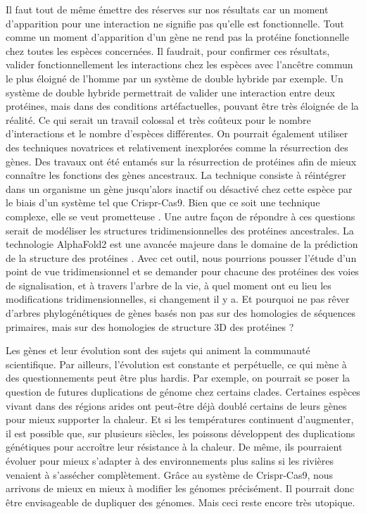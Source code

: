 \par Il faut tout de même émettre des réserves sur nos résultats car un moment d’apparition pour une interaction ne signifie pas qu’elle est fonctionnelle. Tout comme un moment d’apparition d’un gène ne rend pas la protéine fonctionnelle chez toutes les espèces concernées. Il faudrait, pour confirmer ces résultats, valider fonctionnellement les interactions chez les espèces avec l’ancêtre commun le plus éloigné de l’homme par un système de double hybride par exemple. Un système de double hybride permettrait de valider une interaction entre deux protéines, mais dans des conditions artéfactuelles, pouvant être très éloignée de la réalité. Ce qui serait un travail colossal et très coûteux pour le nombre d’interactions et le nombre d’espèces différentes. On pourrait également utiliser des techniques novatrices et relativement inexplorées comme la résurrection des gènes. Des travaux ont été entamés sur la résurrection de protéines afin de mieux connaître les fonctions des gènes ancestraux. La technique consiste à réintégrer dans un organisme un gène jusqu’alors inactif ou désactivé chez cette espèce par le biais d’un système tel que Crispr-Cas9. Bien que ce soit une technique complexe, elle se veut prometteuse \parencite{harms_evolutionary_2013}. Une autre façon de répondre à ces questions serait de modéliser les structures tridimensionnelles des protéines ancestrales. La technologie AlphaFold2 est une avancée majeure dans le domaine de la prédiction de la structure des protéines \parencite{cramer_alphafold2_2021}. Avec cet outil, nous pourrions pousser l’étude d’un point de vue tridimensionnel et se demander pour chacune des protéines des voies de signalisation, et à travers l’arbre de la vie, à quel moment ont eu lieu les modifications tridimensionnelles, si changement il y a. Et pourquoi ne pas rêver d'arbres phylogénétiques de gènes basés non pas sur des homologies de séquences primaires, mais sur des homologies de structure 3D des protéines ?
\par Les gènes et leur évolution sont des sujets qui animent la communauté scientifique. Par ailleurs, l’évolution est constante et perpétuelle, ce qui mène à des questionnements peut être plus hardis. Par exemple, on pourrait se poser la question de futures duplications de génome chez certains clades. Certaines espèces vivant dans des régions arides ont peut-être déjà doublé certains de leurs gènes pour mieux supporter la chaleur. Et si les températures continuent d'augmenter, il est possible que, sur plusieurs siècles, les poissons développent des duplications génétiques pour accroître leur résistance à la chaleur. De même, ils pourraient évoluer pour mieux s'adapter à des environnements plus salins si les rivières venaient à s'assécher complètement. Grâce au système de Crispr-Cas9, nous arrivons de mieux en mieux à modifier les génomes précisément. Il pourrait donc être envisageable de dupliquer des génomes. Mais ceci reste encore très utopique. 
